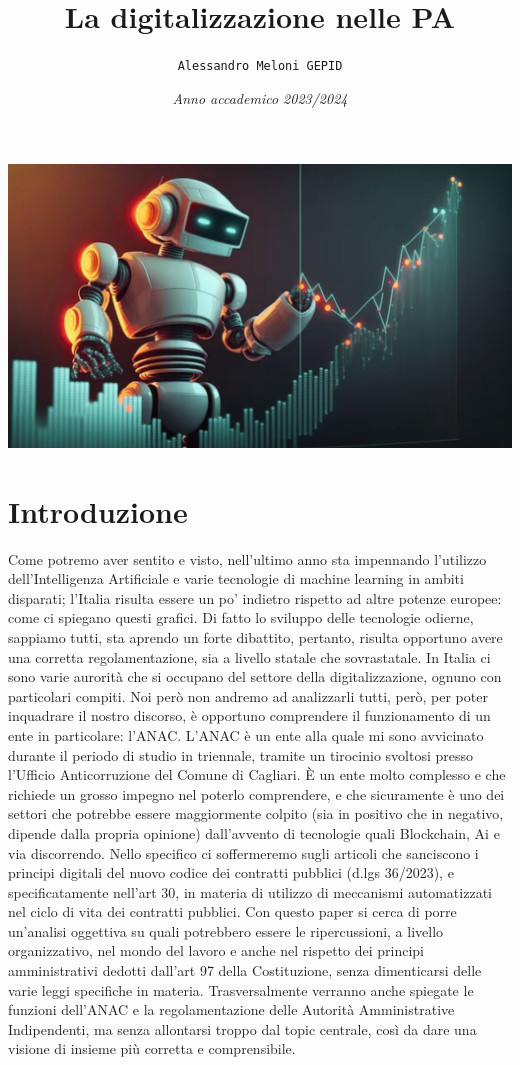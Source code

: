 \documentclass{article}
\title{\textbf{La digitalizzazione nelle PA}}
\author{\texttt{Alessandro Meloni GEPID}}
\date{\textit{Anno accademico 2023/2024}}
\begin{document}
\maketitle
    \includegraphics[width = 0.9\linewidth]{Img.jpg}
\centering \tableofcontents
\newpage\centering
\section{Introduzione}
\flushleft \begin{justify}

Come potremo aver sentito e visto, nell'ultimo anno sta impennando l'utilizzo dell'Intelligenza Artificiale e varie tecnologie di machine learning in ambiti disparati; l'Italia risulta essere un po' indietro rispetto ad altre potenze europee: come ci spiegano questi grafici.
Di fatto lo sviluppo delle tecnologie odierne, sappiamo tutti, sta aprendo un forte dibattito, pertanto, risulta opportuno avere una corretta regolamentazione, sia a livello statale che sovrastatale.
In Italia ci sono varie aurorità che si occupano del settore della digitalizzazione, ognuno con particolari compiti. Noi però non andremo ad analizzarli tutti, però, per poter inquadrare il nostro discorso, è opportuno comprendere il funzionamento di un ente in particolare: l'ANAC.
L'ANAC è un ente alla quale mi sono avvicinato durante il periodo di studio in triennale, tramite un tirocinio svoltosi presso l'Ufficio Anticorruzione del Comune di Cagliari. È un ente molto complesso e che richiede un grosso impegno nel poterlo comprendere, e che sicuramente è uno dei settori che potrebbe essere maggiormente colpito (sia in positivo che in negativo, dipende dalla propria opinione) dall'avvento di tecnologie quali Blockchain, Ai e via discorrendo. Nello specifico ci soffermeremo sugli articoli che sanciscono i principi digitali del nuovo codice dei contratti pubblici (d.lgs 36/2023), e specificatamente nell'art 30, in materia di utilizzo di meccanismi automatizzati nel ciclo di vita dei contratti pubblici. Con questo paper si cerca di porre un'analisi oggettiva su quali potrebbero essere le ripercussioni, a livello organizzativo, nel mondo del lavoro e anche nel rispetto dei principi amministrativi dedotti dall'art 97 della Costituzione, senza dimenticarsi delle varie leggi specifiche in materia.
Trasversalmente verranno anche spiegate le funzioni dell'ANAC e la regolamentazione delle Autorità Amministrative Indipendenti, ma senza allontarsi troppo dal topic centrale, così da dare una visione di insieme più corretta e comprensibile.
\end{justify}
\end{document}
